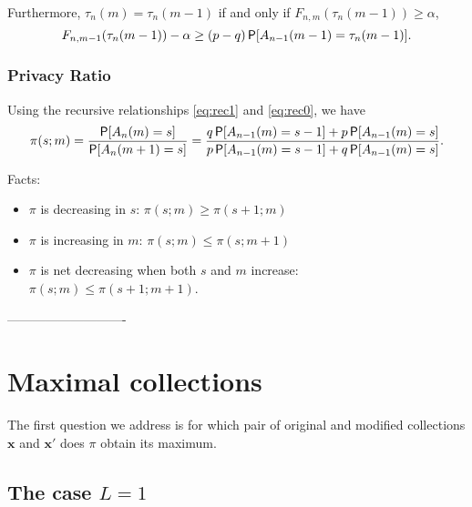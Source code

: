 \documentclass[11pt,draft]{article}
\newcommand{\xv}{\mathbf{x}}
\begin{document}
Furthermore, $\tau_n(m) = \tau_n(m-1)$ if and only if
$F_{n,m}(\tau_n(m-1)) \geq \alpha$, \ie
\[ F_{n,m-1}(\tau_n(m-1)) - \alpha \geq (p-q)\P[A_{n-1}(m-1) = \tau_n(m-1)]. \]


\subsubsection{Privacy Ratio}


Using the recursive relationships \eqref{eq:rec1} and \eqref{eq:rec0}, we have
\[ \pi(s; m) = \frac{\P[A_n(m) = s]}{\P[A_n(m+1) = s]}
 = \frac{q\P[A_{n-1}(m) = s-1] + p\P[A_{n-1}(m) = s]}
 {p\P[A_{n-1}(m) = s-1] + q\P[A_{n-1}(m) = s]}.
\]

Facts:
\begin{itemize}
\item $\pi$ is decreasing in $s$: $\pi(s;m) \geq \pi(s+1; m)$
\item $\pi$ is increasing in $m$: $\pi(s;m) \leq \pi(s; m+1)$
\item $\pi$ is net decreasing when both $s$ and $m$ increase:
$\pi(s;m) \leq \pi(s+1; m+1)$.
\end{itemize}


----------------------------



\section{Maximal collections}


The first question we address is for which pair of original and modified collections $\xv$ and $\xv'$ does $\pi$ obtain its maximum.

\subsection{The case $L = 1$}
\end{document}
